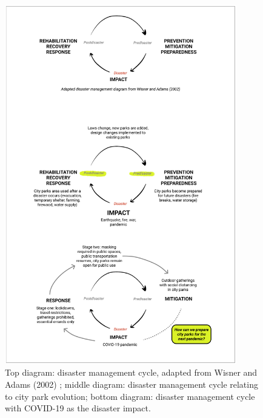 \newpage
\null
\vfill
\begin{figure}[H]
  \centering
  \captionsetup{width=0.9\textwidth}
  \includegraphics[width=0.9\textwidth]{images/crisis/crisis_management.png}\par\hspace{3pt}
  \caption[Crisis management diagram]{Top diagram: disaster management cycle, adapted from Wisner and Adams (2002) \cite{wisner_environmental_2002}; middle diagram: disaster management cycle relating to city park evolution; bottom diagram: disaster management cycle with COVID-19 as the disaster impact.}
  \label{fig:crisis_management}
\end{figure}

